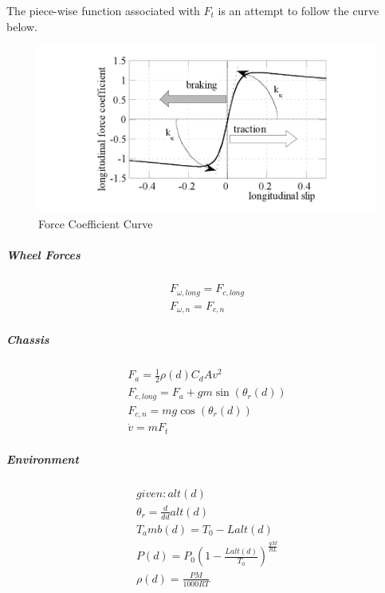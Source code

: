 \documentclass[12pt,letterpaper]{report}
\begin{document}
The piece-wise function associated with $F_t$ is an attempt to follow the curve below.

 \begin{figure}[H]
  \centering
  \includegraphics[scale=1]{wheel_slip}
  \caption{Force Coefficient Curve}
\end{figure}

\subparagraph{Wheel Forces}

\begin{gather}
F_{\omega,long} = F_{c,long} \\
F_{\omega,n} = F_{c,n}
\end{gather}


\subparagraph{Chassis}

\begin{gather}
F_a = \frac{1}{2}\rho(d)C_dAv^2 \\
F_{c,long}  = F_a + gm\sin(\theta_r (d))  \\
F_{c,n} = mg\cos(\theta_r (d)) \\
\dot{v} = mF_t
\end{gather}

\subparagraph{Environment}

\begin{gather}
given: alt(d) \\
\theta_r  = \frac{d}{dd} alt(d) \\
T_amb(d) = T_0 - L alt(d) \\
P(d) = P_0 \left( 1 - \frac{L alt(d)}{T_0} \right)^{\frac{gM}{RL}}\\
\rho(d) = \frac{PM}{1000RT}  
\end{gather}
\end{document}
